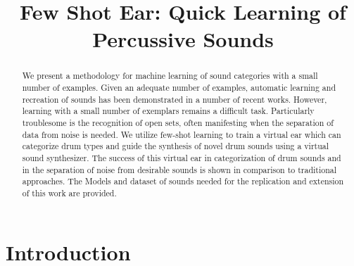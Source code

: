 \documentclass{article}
\title{Few Shot Ear: Quick Learning of Percussive Sounds}
\begin{document}
%
\maketitle
%
\begin{abstract}
We present a methodology for machine learning of sound categories with a small number of examples. 
Given an adequate number of examples, automatic learning and recreation of sounds has been demonstrated in a number of recent works.
However, learning with a small number of exemplars remains a difficult task. Particularly troublesome is the recognition of open sets, often manifesting when the separation of data from noise is needed.
We utilize few-shot learning to train a virtual ear which can categorize drum types and guide the synthesis of novel drum sounds using a virtual sound synthesizer.
The success of this virtual ear in categorization of drum sounds and in the separation of noise from desirable sounds is shown in comparison to traditional approaches.
The Models and dataset of sounds needed for the replication and extension of this work are provided. 
\end{abstract}
%
\begin{keywords}

\end{keywords}
%
\section{Introduction}
\label{sec:intro}



\end{document}
